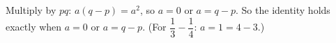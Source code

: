 Multiply by $pq$: $a(q-p)=a^2$, so $a=0$ or $a=q-p$. So the identity holds exactly when $\boxed{a=0\text{ or }a=q-p}$. (For $\dfrac13-\dfrac14$: $a=1=4-3$.)
